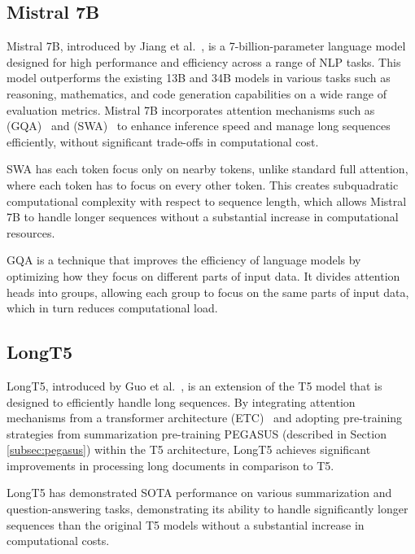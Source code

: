 \documentclass[english, ba, kiv, he, iso690numb, pdf, viewonly]{fasthesis}
\begin{document}
\subsection{Mistral 7B}
Mistral 7B, introduced by Jiang et al.~\cite{jiang2023mistral}, is a 7-billion-parameter language model designed for high performance and efficiency across a range of NLP tasks. This model outperforms the existing 13B and 34B models in various tasks such as reasoning, mathematics, and code generation capabilities on a wide range of evaluation metrics. Mistral 7B incorporates attention mechanisms such as  (GQA)~\cite{ainslie2023gqa} and  (SWA)~\cite{beltagy2020longformer} to enhance inference speed and manage long sequences efficiently, without significant trade-offs in computational cost. 

SWA has each token focus only on nearby tokens, unlike standard full attention, where each token has to focus on every other token. This creates subquadratic computational complexity with respect to sequence length, which allows Mistral 7B to handle longer sequences without a substantial increase in computational resources.

GQA is a technique that improves the efficiency of language models by optimizing how they focus on different parts of input data. It divides attention heads into groups, allowing each group to focus on the same parts of input data, which in turn reduces computational load.

\subsection{LongT5}
LongT5, introduced by Guo et al.~\cite{guo2022longt5}, is an extension of the T5 model that is designed to efficiently handle long sequences. By integrating attention mechanisms from a transformer architecture  (ETC)~\cite{ainslie2020etc} and adopting pre-training strategies from summarization pre-training PEGASUS (described in Section \ref{subsec:pegasus}) within the T5 architecture, LongT5 achieves significant improvements in processing long documents in comparison to T5. 

LongT5 has demonstrated SOTA performance on various summarization and question-answering tasks, demonstrating its ability to handle significantly longer sequences than the original T5 models without a substantial increase in computational costs.
\end{document}
